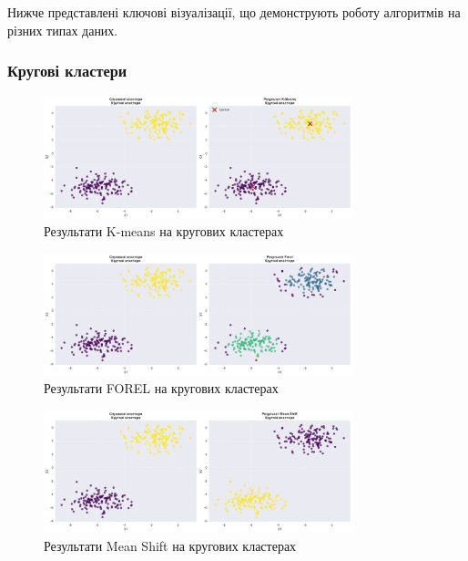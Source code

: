 \documentclass[12pt,a4paper]{article}
\begin{document}
Нижче представлені ключові візуалізації, що демонструють роботу алгоритмів на різних типах даних.

\subsubsection{Кругові кластери}

\begin{figure}[H]
\centering
\includegraphics[width=0.8\textwidth]{clustering_visualizations/K-Means_Кругові_кластери_results.png}
\caption{Результати K-means на кругових кластерах}
\label{fig:kmeans_circular}
\end{figure}

\begin{figure}[H]
\centering
\includegraphics[width=0.8\textwidth]{clustering_visualizations/Forel_Кругові_кластери_results.png}
\caption{Результати FOREL на кругових кластерах}
\label{fig:forel_circular}
\end{figure}

\begin{figure}[H]  
\centering
\includegraphics[width=0.8\textwidth]{clustering_visualizations/Mean Shift_Кругові_кластери_results.png}
\caption{Результати Mean Shift на кругових кластерах}
\label{fig:meanshift_circular}
\end{figure}
\end{document}
